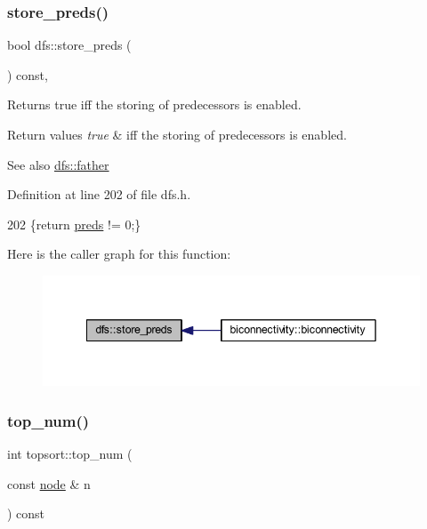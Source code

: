\subsubsection{\texorpdfstring{store\+\_\+preds()}{store\_preds()}\hspace{0.1cm}{\footnotesize\ttfamily [2/2]}}
{\footnotesize\ttfamily bool dfs\+::store\+\_\+preds (\begin{DoxyParamCaption}{ }\end{DoxyParamCaption}) const\hspace{0.3cm}{\ttfamily [inline]}, {\ttfamily [inherited]}}



Returns true iff the storing of predecessors is enabled. 


\begin{DoxyRetVals}{Return values}
{\em true} & iff the storing of predecessors is enabled. \\
\hline
\end{DoxyRetVals}
\begin{DoxySeeAlso}{See also}
\mbox{\hyperlink{classdfs_a3012717ce541b3e56943e2c2c50efdf6}{dfs\+::father}} 
\end{DoxySeeAlso}


Definition at line 202 of file dfs.\+h.


\begin{DoxyCode}
202 \{\textcolor{keywordflow}{return} \mbox{\hyperlink{classdfs_a3fdeb5a211a1bc1753b2a637258c5355}{preds}} != 0;\}
\end{DoxyCode}
Here is the caller graph for this function\+:
\nopagebreak
\begin{figure}[H]
\begin{center}
\leavevmode
\includegraphics[width=342pt]{classdfs_ad0233128f2958d630102096aa6f3b9ef_icgraph}
\end{center}
\end{figure}
\mbox{\label{classtopsort_a0f0b52c54ffa4d1056ef96f16489f30f}} 
\subsubsection{\texorpdfstring{top\+\_\+num()}{top\_num()}}
{\footnotesize\ttfamily int topsort\+::top\+\_\+num (\begin{DoxyParamCaption}\item[{const \mbox{\hyperlink{classnode}{node}} \&}]{n }\end{DoxyParamCaption}) const\hspace{0.3cm}{\ttfamily [inline]}}

